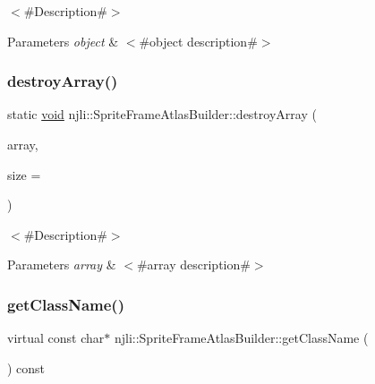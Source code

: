 $<$\#\+Description\#$>$


\begin{DoxyParams}{Parameters}
{\em object} & $<$\#object description\#$>$ \\
\hline
\end{DoxyParams}
\mbox{\label{classnjli_1_1_sprite_frame_atlas_builder_a5c55b6ead0735374e555a30a1c52d3bb}} 
\subsubsection{\texorpdfstring{destroy\+Array()}{destroyArray()}}
{\footnotesize\ttfamily static \mbox{\hyperlink{_thread_8h_af1e856da2e658414cb2456cb6f7ebc66}{void}} njli\+::\+Sprite\+Frame\+Atlas\+Builder\+::destroy\+Array (\begin{DoxyParamCaption}\item[{\mbox{\hyperlink{classnjli_1_1_sprite_frame_atlas_builder}{Sprite\+Frame\+Atlas\+Builder}} $\ast$$\ast$}]{array,  }\item[{const \mbox{\hyperlink{_util_8h_a10e94b422ef0c20dcdec20d31a1f5049}{u32}}}]{size = {} }\end{DoxyParamCaption})\hspace{0.3cm}{\ttfamily [static]}}

$<$\#\+Description\#$>$


\begin{DoxyParams}{Parameters}
{\em array} & $<$\#array description\#$>$ \\
\hline
\end{DoxyParams}
\mbox{\label{classnjli_1_1_sprite_frame_atlas_builder_ab9727608e426483e33c4c8d11ad3dc67}} 
\subsubsection{\texorpdfstring{get\+Class\+Name()}{getClassName()}}
{\footnotesize\ttfamily virtual const char$\ast$ njli\+::\+Sprite\+Frame\+Atlas\+Builder\+::get\+Class\+Name (\begin{DoxyParamCaption}{ }\end{DoxyParamCaption}) const\hspace{0.3cm}{\ttfamily [virtual]}}

